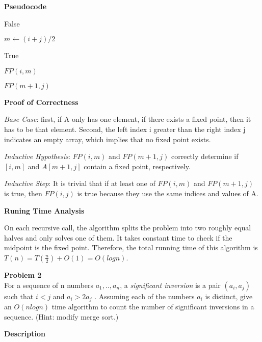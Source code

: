 \documentclass[12pt,article]{article}
\newenvironment{problem}[2][Problem]
    { \begin{mdframed}[backgroundcolor=gray!20] \textbf{#1 #2} \\}
    {  \end{mdframed}}
\begin{document}
\textbf{Pseudocode}

\begin{algorithm}
\caption{$FP(i,j)$}\label{alg:q2}
\begin{algorithmic}

        \Return False
    \EndIf

    \State $m \gets (i+j) / 2$


        \Return True

        \Return $FP(i,m)$
    \Else

        \Return $FP(m+1,j)$
    \EndIf

\end{algorithmic}
\end{algorithm}

\textbf{Proof of Correctness}

\textit{Base Case}: first, if A only has one element, if there exists a fixed point, then it has to be that element. Second, the left index i greater than the right index j indicates an empty array, which implies that no fixed point exists.

\textit{Inductive Hypothesis}: $FP(i,m)$ and $FP(m+1,j)$ correctly determine if $[i,m]$ and $A[m+1,j]$ contain a fixed point, respectively.

\textit{Inductive Step}: It is trivial that if at least one of $FP(i,m)$ and $FP(m+1,j)$ is true, then $FP(i,j)$ is true because they use the same indices and values of A.

\textbf{Runing Time Analysis}

On each recursive call, the algorithm splits the problem into two roughly equal halves and only solves one of them. It takes constant time to check if the midpoint is the fixed point. Therefore, the total running time of this algorithm is $T(n) = T(\frac{n}{2}) + O(1) = O(logn)$.

\newpage
\begin{problem}{2} 
For a sequence of n numbers $a_1, .., a_n$, a \textit{significant inversion} is a pair $(a_i, a_j)$ such that $i < j$ and $a_i > 2a_j$ . Assuming each of the numbers $a_i$ is distinct, give an $O(nlogn)$ time algorithm to count the number of significant inversions in a sequence. (Hint: modify merge sort.)
\end{problem}

\textbf{Description}
\end{document}
